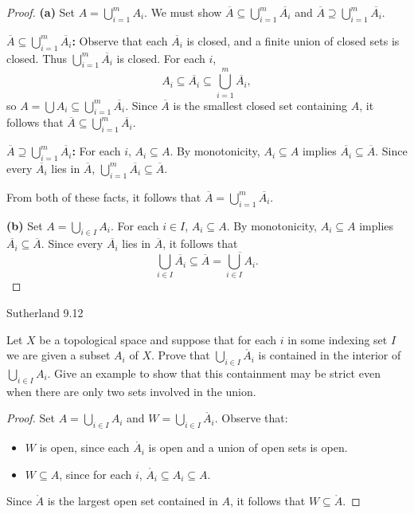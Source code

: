\documentclass[minion]{homework}
\begin{document}
\begin{problems}
\begin{proof}
\textbf{(a)} Set $A = \bigcup_{i=1}^m A_i$. We must show $\overline{A} \subseteq \bigcup_{i=1}^m \overline{A_i}$ and $\overline{A} \supseteq \bigcup_{i=1}^m \overline{A_i}$.

\textbf{$\overline{A} \subseteq \bigcup_{i=1}^m \overline{A_i}$:} Observe that each $\overline{A_i}$ is closed, and a finite union of closed sets is closed. Thus $\bigcup_{i=1}^m \overline{A_i}$ is closed. For each $i$,
\[
A_i \subseteq \overline{A_i} \subseteq \bigcup_{i=1}^m \overline{A_i},
\]
so $A = \bigcup A_i \subseteq \bigcup_{i=1}^m \overline{A_i}$. Since $\overline{A}$ is the smallest closed set containing $A$, it follows that $\overline{A} \subseteq \bigcup_{i=1}^m \overline{A_i}$.

\textbf{$\overline{A} \supseteq \bigcup_{i=1}^m \overline{A_i}$:} For each $i$, $A_i \subseteq A$. By monotonicity, $A_i \subseteq A$ implies $\overline{A_i} \subseteq \overline{A}$. Since every $\overline{A_i}$ lies in $\overline{A}$, $\bigcup_{i=1}^m \overline{A_i} \subseteq \overline{A}$.

From both of these facts, it follows that $\overline{A} = \bigcup_{i=1}^m \overline{A_i}$.

\textbf{(b)} Set $A = \bigcup_{i \in I} A_i$. For each $i \in I$, $A_i \subseteq A$. By monotonicity, $A_i \subseteq A$ implies $\overline{A_i} \subseteq \overline{A}$. Since every $\overline{A_i}$ lies in $\overline{A}$, it follows that
\[
\bigcup_{i \in I} \overline{A_i} \subseteq \overline{A} = \overline{\bigcup_{i \in I} A_i}.
\]
\end{proof}

\problem Sutherland 9.12

Let $X$ be a topological space and suppose that for each $i$ in some indexing set $I$ we are given a subset $A_i$ of $X$. Prove that $\bigcup_{i \in I} \mathring{A_i}$ is contained in the interior of $\bigcup_{i \in I} A_i$. Give an example to show that this containment may be strict even when there are only two sets involved in the union.

\begin{proof}
Set $A = \bigcup_{i \in I} A_i$ and $W = \bigcup_{i \in I} \mathring{A_i}$. Observe that:
\begin{itemize}
  \item $W$ is open, since each $\mathring{A_i}$ is open and a union of open sets is open.
  \item $W \subseteq A$, since for each $i$, $\mathring{A_i} \subseteq A_i \subseteq A$.
\end{itemize}
Since $\mathring{A}$ is the largest open set contained in $A$, it follows that $W \subseteq \mathring{A}$.


\end{proof}
\end{problems}
\end{document}
